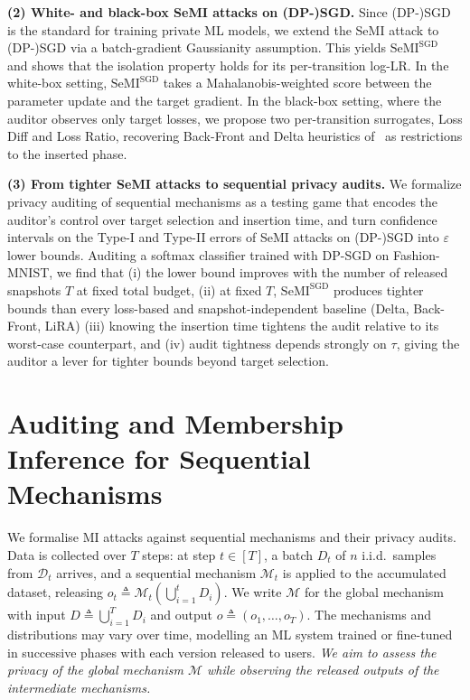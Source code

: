 \documentclass{article}
\theoremstyle{plain}
\theoremstyle{definition}
\theoremstyle{remark}
\newcommand{\cM}{\ensuremath{\mathcal{M}}}
\newcommand{\SeMISGD}{\mathrm{SeMI}^{\mathrm{SGD}}}
\begin{document}
\textbf{(2) White- and black-box SeMI attacks on (DP-)SGD.} Since (DP-)SGD~\citep{kiefer1952stochastic, abadi2016deep} is the standard for training private ML models, we extend the SeMI attack to (DP-)SGD via a batch-gradient Gaussianity assumption. This yields $\SeMISGD$ and shows that the isolation property holds for its per-transition log-LR. In the white-box setting, $\SeMISGD$ takes a Mahalanobis-weighted score between the parameter update and the target gradient. In the black-box setting, where the auditor observes only target losses, we propose two per-transition surrogates, Loss Diff and Loss Ratio, recovering Back-Front and Delta heuristics of~\cite{jagielskiHowCombineMembershipInference2023} as restrictions to the inserted phase.

\textbf{(3) From tighter SeMI attacks to sequential privacy audits.} We formalize privacy auditing of sequential mechanisms as a testing game that encodes the auditor's control over target selection and insertion time, and turn confidence intervals on the Type-I and Type-II errors of SeMI attacks on (DP-)SGD into $\varepsilon$ lower bounds. Auditing a softmax classifier trained with DP-SGD on Fashion-MNIST, we find that (i) the lower bound improves with the number of released snapshots $T$ at fixed total budget, (ii) at fixed $T$, $\SeMISGD$ produces tighter bounds than every loss-based and snapshot-independent baseline (Delta, Back-Front, LiRA) (iii) knowing the insertion time tightens the audit relative to its worst-case counterpart, and (iv) audit tightness depends strongly on $\tau$, giving the auditor a lever for tighter bounds beyond target selection.




\vspace*{-1em}\section{Auditing and Membership Inference for Sequential Mechanisms}\label{sec:mi_tests}\vspace*{-.8em}
We formalise MI attacks against sequential mechanisms and their privacy audits. Data is collected over $T$ steps: at step $t \in [T]$, a batch $D_t$ of $n$ i.i.d.\ samples from $\mathcal{D}_t$ arrives, and a sequential mechanism $\mathcal{M}_t$ is applied to the accumulated dataset, releasing $o_t \triangleq \mathcal{M}_t(\bigcup_{i=1}^t D_i)$. We write $\cM$ for the global mechanism with input $D \triangleq \bigcup_{i=1}^{T} D_i$ and output $o \triangleq (o_1,\dots,o_T)$. The mechanisms and distributions may vary over time, modelling an ML system trained or fine-tuned in successive phases with each version released to users.
\textit{We aim to assess the privacy of the global mechanism $\cM$ while observing the released outputs of the intermediate mechanisms.}
\end{document}

